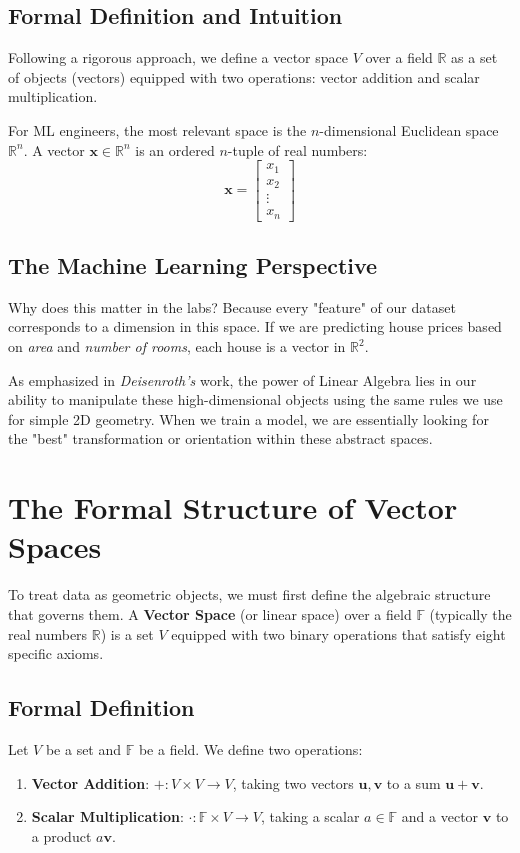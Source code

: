 \subsection{Formal Definition and Intuition}
Following a rigorous approach, we define a vector space $V$ over a field $\mathbb{R}$ as a set of objects (vectors) equipped with two operations: vector addition and scalar multiplication.

For ML engineers, the most relevant space is the $n$-dimensional Euclidean space $\mathbb{R}^n$. A vector $\mathbf{x} \in \mathbb{R}^n$ is an ordered $n$-tuple of real numbers:
$$ \mathbf{x} = \begin{bmatrix} x_1 \\ x_2 \\ \vdots \\ x_n \end{bmatrix} $$

\subsection{The Machine Learning Perspective}
Why does this matter in the labs? Because every "feature" of our dataset corresponds to a dimension in this space. If we are predicting house prices based on \textit{area} and \textit{number of rooms}, each house is a vector in $\mathbb{R}^2$.

As emphasized in \textit{Deisenroth's} work, the power of Linear Algebra lies in our ability to manipulate these high-dimensional objects using the same rules we use for simple 2D geometry. When we train a model, we are essentially looking for the "best" transformation or orientation within these abstract spaces.

\section{The Formal Structure of Vector Spaces}

To treat data as geometric objects, we must first define the algebraic structure that governs them. A \textbf{Vector Space} (or linear space) over a field $\mathbb{F}$ (typically the real numbers $\mathbb{R}$) is a set $V$ equipped with two binary operations that satisfy eight specific axioms.

\subsection{Formal Definition}
Let $V$ be a set and $\mathbb{F}$ be a field. We define two operations:
\begin{enumerate}
    \item \textbf{Vector Addition}: $+: V \times V \to V$, taking two vectors $\mathbf{u}, \mathbf{v}$ to a sum $\mathbf{u} + \mathbf{v}$.
    \item \textbf{Scalar Multiplication}: $\cdot: \mathbb{F} \times V \to V$, taking a scalar $a \in \mathbb{F}$ and a vector $\mathbf{v}$ to a product $a\mathbf{v}$.
\end{enumerate}

